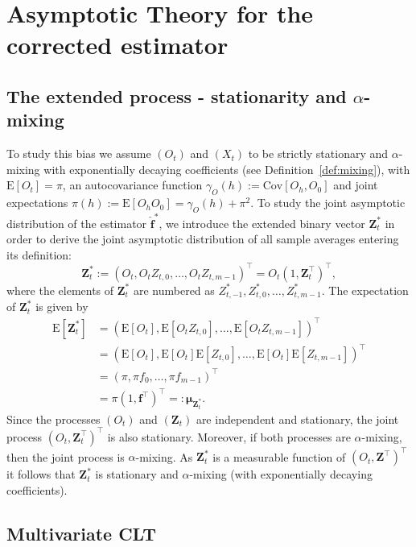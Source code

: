 ﻿\documentclass[12pt,a4paper]{scrreprt}
\theoremstyle{definition}
\begin{document}
\section{Asymptotic Theory for the corrected estimator} \label{sec:fstar_hat}
\subsection*{The extended process - stationarity and $\alpha$-mixing}
To study this bias we assume $(O_t)$ and $(X_t)$ to be strictly stationary and 
$\alpha$-mixing with exponentially decaying coefficients (see Definition~\ref{def:mixing}), 
with $\mathrm{E}[O_t] = \pi $, an autocovariance function $\gamma_{O}(h) := \mathrm{Cov}[O_h, O_0]$ 
and joint expectations $\pi(h):= \mathrm{E}[O_h O_0] = \gamma_O(h) + \pi^2$. To study 
the joint asymptotic distribution of the estimator $\hat{\boldsymbol{f}}^*$, we 
introduce the extended binary vector $\boldsymbol{Z}^*_t$ in order to derive the joint asymptotic distribution of all sample averages entering its definition:
\[\boldsymbol{Z}^*_t:= (O_t, O_t Z_{t,0}, \ldots, O_t Z_{t, m-1})^\top =  O_t (1, \boldsymbol{Z}^\top_t)^\top,\]
where the elements of $\boldsymbol{Z}_t^*$ are numbered as $Z_{t,-1}^*, Z_{t,0}^*, \ldots, Z_{t, m-1}^*$. The expectation of $\boldsymbol{Z}_t^*$ is given by
\begin{align*}
    \mathrm{E}[\boldsymbol{Z}^{*}_t] &= (\mathrm{E}[O_t], \mathrm{E}[O_t Z_{t,0}], \ldots, \mathrm{E}[O_t Z_{t, m-1}])^\top \\
    &= (\mathrm{E}[O_t], \mathrm{E}[O_t] \mathrm{E}[Z_{t, 0}], \ldots, \mathrm{E}[O_t] \mathrm{E}[Z_{t, m-1}])^\top \tag{Independence}\\
    &= (\pi, \pi f_0, \ldots, \pi f_{m-1})^\top \\
    &=\pi (1, \boldsymbol{f}^{\top})^\top =: \boldsymbol{\mu}_{\boldsymbol{Z}_t^{*}}.
\end{align*}
Since the processes $(O_t)$ and $(\boldsymbol{Z}_t)$ are independent and stationary, the joint process $(O_t, \boldsymbol{Z}_t^{\top})^{\top}$ is also stationary. 
Moreover, if both processes are $\alpha$-mixing, then the joint process is $\alpha$-mixing. As $\boldsymbol{Z}_t^*$ is a measurable function of $(O_t, \boldsymbol{Z}^\top)^\top$ it follows that $\boldsymbol{Z}^*_t$ is stationary and $\alpha$-mixing (with exponentially decaying coefficients).
\subsection*{Multivariate CLT}
\end{document}
